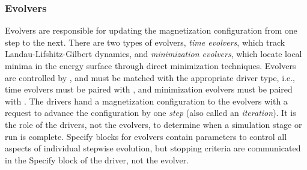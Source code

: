 \subsubsection{Evolvers\label{sec:oxsEvolvers}}
Evolvers are responsible for updating the magnetization configuration
from one step to the next.  There are two types of evolvers,
\textit{time evolvers}, which track Landau-Lifshitz-Gilbert dynamics,
and \textit{minimization evolvers}, which locate local minima in the
energy surface through direct minimization techniques.  Evolvers are
controlled by , and must be matched with the appropriate
driver type, i.e., time evolvers must be paired with
, and
minimization evolvers must be paired with .  The drivers hand a magnetization
configuration to the evolvers with a request to advance the
configuration by one \textit{step} (also called an \textit{iteration}).
It is the role of the drivers, not the evolvers, to determine when a
simulation stage or run is complete.  Specify blocks for evolvers
contain parameters to control all aspects of individual stepwise
evolution, but stopping criteria are communicated in the Specify block
of the driver, not the evolver.

